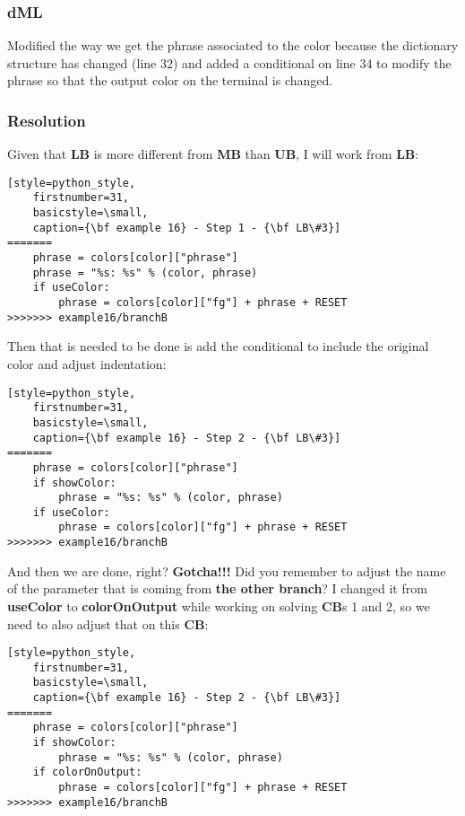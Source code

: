 \subsubsection{dML}
Modified the way we get the phrase associated to the color because the dictionary structure has changed (line 32) and added a
conditional on line 34 to modify the phrase so that the output color on the terminal is changed.

\subsubsection{Resolution}
Given that {\bf LB} is more different from {\bf MB} than {\bf UB}, I will work from {\bf LB}:

\begin{lstlisting}[style=python_style,
	firstnumber=31,
	basicstyle=\small,
	caption={\bf example 16} - Step 1 - {\bf LB\#3}]
=======
    phrase = colors[color]["phrase"]
    phrase = "%s: %s" % (color, phrase)
    if useColor:
        phrase = colors[color]["fg"] + phrase + RESET
>>>>>>> example16/branchB
\end{lstlisting}

Then that is needed to be done is add the conditional to include the original color and adjust indentation:

\begin{lstlisting}[style=python_style,
	firstnumber=31,
	basicstyle=\small,
	caption={\bf example 16} - Step 2 - {\bf LB\#3}]
=======
    phrase = colors[color]["phrase"]
    if showColor:
        phrase = "%s: %s" % (color, phrase)
    if useColor:
        phrase = colors[color]["fg"] + phrase + RESET
>>>>>>> example16/branchB
\end{lstlisting}

And then we are done, right? {\bf Gotcha!!!} Did you remember to adjust the name of the parameter that is coming from
{\bf the other branch}? I changed it from {\bf useColor} to {\bf colorOnOutput} while working on solving {\bf CB}s 1 and 2, so we need to also adjust that on this {\bf CB}:

\begin{lstlisting}[style=python_style,
	firstnumber=31,
	basicstyle=\small,
	caption={\bf example 16} - Step 2 - {\bf LB\#3}]
=======
    phrase = colors[color]["phrase"]
    if showColor:
        phrase = "%s: %s" % (color, phrase)
    if colorOnOutput:
        phrase = colors[color]["fg"] + phrase + RESET
>>>>>>> example16/branchB
\end{lstlisting}


